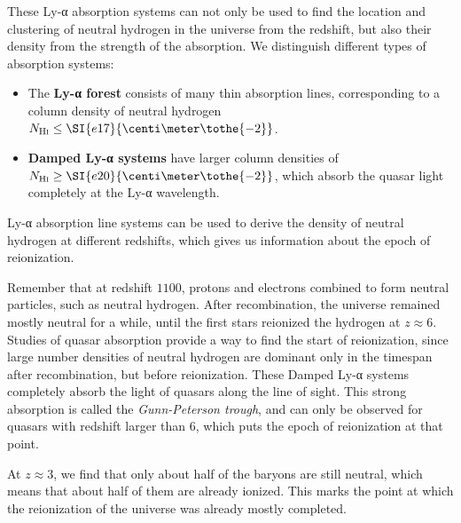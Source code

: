 These Ly-α absorption systems can not only be used to find the location and clustering of neutral hydrogen in the universe from the redshift, but also their density from the strength of the absorption.
We distinguish different types of absorption systems:
\begin{itemize}
	\item The \textbf{Ly-α forest} consists of many thin absorption lines,
	corresponding to a column density of neutral hydrogen $N_{\mathrm{H}\textsc{i}} \leq \SI{e17}{\centi\meter\tothe{-2}}$.
	\item \textbf{Damped Ly-α systems} have larger column densities of $N_{\mathrm{H}\textsc{i}} \geq \SI{e20}{\centi\meter\tothe{-2}}$,
	which absorb the quasar light completely at the Ly-α wavelength.
\end{itemize}

Ly-α absorption line systems can be used to derive the density of neutral hydrogen at different redshifts, which gives us information about the epoch of reionization.

Remember that at redshift $1100$, protons and electrons combined to form neutral particles, such as neutral hydrogen.
After recombination, the universe remained mostly neutral for a while, until the first stars reionized the hydrogen at $z \approx 6$.
Studies of quasar absorption provide a way to find the start of reionization, since large number densities of neutral hydrogen are dominant only in the timespan after recombination, but before reionization.
These Damped Ly-α systems completely absorb the light of quasars along the line of sight.
This strong absorption is called the \emph{Gunn-Peterson trough}, and can only be observed for quasars with redshift larger than $6$, which puts the epoch of reionization at that point.

At $z \approx 3$, we find that only about half of the baryons are still neutral, which means that about half of them are already ionized.
This marks the point at which the reionization of the universe was already mostly completed.





